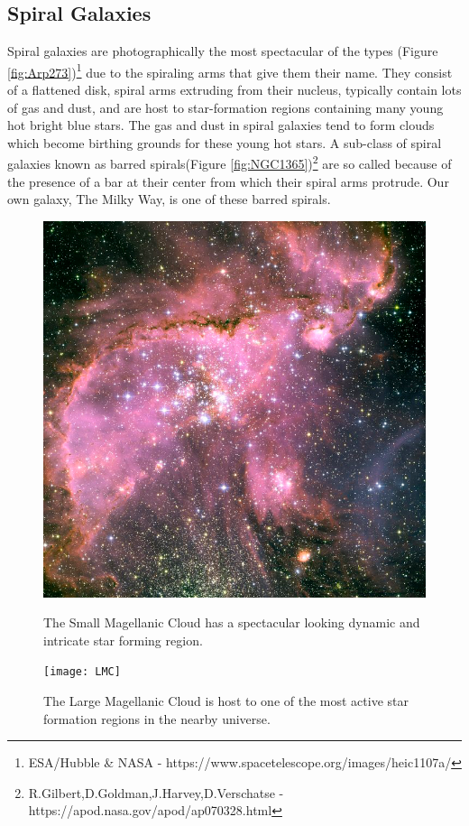 \documentclass[12pt, oneside]{smuthesis}
\begin{document}
\subsection{\sc Spiral Galaxies} \label{spiralGalaxies}

Spiral galaxies are photographically the most spectacular of the types (Figure \ref{fig:Arp273})\footnote{ESA/Hubble \& NASA - https://www.spacetelescope.org/images/heic1107a/} due to the spiraling arms that give them their name. They consist of a flattened disk, spiral arms extruding from their nucleus, typically contain lots of gas and dust, and are host to star-formation regions containing many young hot bright blue stars. The gas and dust in spiral galaxies tend to form clouds which become birthing grounds for these young hot stars. A sub-class of spiral galaxies known as barred spirals(Figure \ref{fig:NGC1365})\footnote{R.Gilbert,D.Goldman,J.Harvey,D.Verschatse - https://apod.nasa.gov/apod/ap070328.html} are so called because of the presence of a bar at their center from which their spiral arms protrude. Our own galaxy, The Milky Way, is one of these barred spirals.

\begin{figure}[H]
	\centering
	\begin{minipage}{0.48\textwidth}
		\centering
		\includegraphics[width=0.9\linewidth]{SMC}
		\caption{The Small Magellanic Cloud has a spectacular looking dynamic and intricate star forming region.}
		\label{fig:SMC}
	\end{minipage}
	\begin{minipage}{0.04\textwidth}
		\centering
	\end{minipage}
	\begin{minipage}{0.48\textwidth}
		\centering
		\texttt{[image: LMC]}
		\caption{The Large Magellanic Cloud is host to one of the most active star formation regions in the nearby universe.}
		\label{fig:LMC}
	\end{minipage}
\end{figure}
\end{document}
